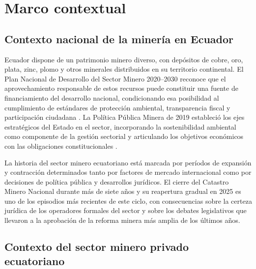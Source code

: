 \section{Marco contextual}

\subsection{Contexto nacional de la minería en Ecuador}

Ecuador dispone de un patrimonio minero diverso, con depósitos de cobre, oro, plata, zinc, plomo y otros minerales distribuidos en su territorio continental. El Plan Nacional de Desarrollo del Sector Minero 2020--2030 reconoce que el aprovechamiento responsable de estos recursos puede constituir una fuente de financiamiento del desarrollo nacional, condicionando esa posibilidad al cumplimiento de estándares de protección ambiental, transparencia fiscal y participación ciudadana \parencite{plan_nacional_sector_minero_2020}. La Política Pública Minera de 2019 estableció los ejes estratégicos del Estado en el sector, incorporando la sostenibilidad ambiental como componente de la gestión sectorial y articulando los objetivos económicos con las obligaciones constitucionales \parencite{politica_publica_minera_2019}.

La historia del sector minero ecuatoriano está marcada por períodos de expansión y contracción determinados tanto por factores de mercado internacional como por decisiones de política pública y desarrollos jurídicos. El cierre del Catastro Minero Nacional durante más de siete años y su reapertura gradual en 2025 \parencite{arcom_resolucion_0029_2025} es uno de los episodios más recientes de este ciclo, con consecuencias sobre la certeza jurídica de los operadores formales del sector y sobre los debates legislativos que llevaron a la aprobación de la reforma minera más amplia de los últimos años.

\subsection{Contexto del sector minero privado ecuatoriano}

